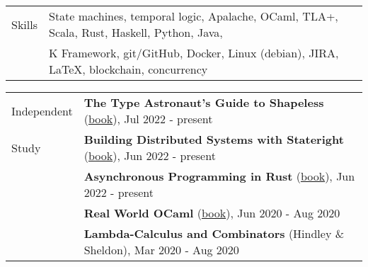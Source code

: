 \documentclass[letterpaper,10pt,oneside]{article}
\begin{document}
\vfill

\newpage


\noindent \begin{tabular}{@{} l l}
 \Large{Skills} & State machines, temporal logic, Apalache, OCaml, TLA+, Scala, Rust, Haskell, Python, Java, \\
 \hspace{1.1in} & K Framework, git/GitHub, Docker, Linux (debian), JIRA, \LaTeX, blockchain, concurrency \\
\end{tabular}

\vfill


\noindent \begin{tabular}{@{} l l}
 \Large{Independent} & \textbf{The Type Astronaut's Guide to Shapeless} (\href{https://books.underscore.io/shapeless-guide/shapeless-guide.html}{book}), Jul 2022 - present \\
 \Large{Study} & \textbf{Building Distributed Systems with Stateright} (\href{https://www.stateright.rs/title-page.html}{book}), Jun 2022 - present \\
 \hspace{1.1in} & \textbf{Asynchronous Programming in Rust} (\href{https://github.com/rust-lang/async-book}{book}), Jun 2022 - present \\
 & \textbf{Real World OCaml} (\href{https://dev.realworldocaml.org/index.html}{book}), Jun 2020 - Aug 2020 \\
 & \textbf{Lambda-Calculus and Combinators} (Hindley \& Sheldon), Mar 2020 - Aug 2020 \\

\end{tabular}
\end{document}
